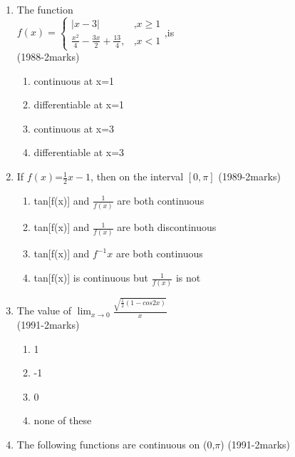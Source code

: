 \documentclass[journal,12pt,twocolumn]{IEEEtran}
\theoremstyle{remark}
\begin{document}
\begin{enumerate}
\item The function \\ $f(x)=\begin{cases}|x-3| & \text{,} x \geq 1 \\
    \frac{x^2}{4}-\frac{3x}{2}+\frac{13}{4}, & \text{,} x<1 
\end{cases}$,is \\ \hfill{(1988-2marks)} 
\begin{enumerate}
    \item continuous at x=1
    \item differentiable at x=1
    \item continuous at x=3
    \item differentiable at x=3 \\ 
\end{enumerate}

\item If $f(x)$=$\frac{1}{2}x-1$, then on the interval $[0,\pi]$ \hfill{(1989-2marks)} 
\begin{enumerate}
    \item tan[f(x)] and $\frac{1}{f(x)}$ are both continuous
    \item tan[f(x)] and $\frac{1}{f(x)}$ are both discontinuous
    \item tan[f(x)] and $f^{-1}x$ are both continuous
    \item tan[f(x)] is continuous but $\frac{1}{f(x)}$ is not \\
\end{enumerate}


\item The value of $\lim_{x\to0}{\frac{\sqrt{\frac{1}{2}(1-cos2x)}}{x}}$ \\
\hfill{(1991-2marks)} 
\begin{enumerate}
    \item 1
    \item -1
    \item 0
    \item none of these \\
\end{enumerate}

\item The following functions are continuous on (0,$\pi$) \hfill{(1991-2marks)} 
\end{enumerate}
\end{document}
